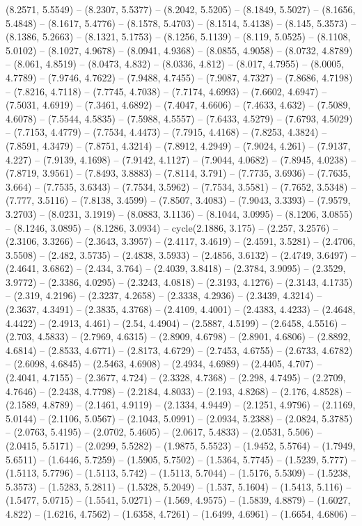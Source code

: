 (8.2571, 5.5549) -- (8.2307, 5.5377) -- (8.2042, 5.5205) -- (8.1849, 5.5027) -- (8.1656, 5.4848) -- (8.1617, 5.4776) -- (8.1578, 5.4703) -- (8.1514, 5.4138) -- (8.145, 5.3573) -- (8.1386, 5.2663) -- (8.1321, 5.1753) -- (8.1256, 5.1139) -- (8.119, 5.0525) -- (8.1108, 5.0102) -- (8.1027, 4.9678) -- (8.0941, 4.9368) -- (8.0855, 4.9058) -- (8.0732, 4.8789) -- (8.061, 4.8519) -- (8.0473, 4.832) -- (8.0336, 4.812) -- (8.017, 4.7955) -- (8.0005, 4.7789) -- (7.9746, 4.7622) -- (7.9488, 4.7455) -- (7.9087, 4.7327) -- (7.8686, 4.7198) -- (7.8216, 4.7118) -- (7.7745, 4.7038) -- (7.7174, 4.6993) -- (7.6602, 4.6947) -- (7.5031, 4.6919) -- (7.3461, 4.6892) -- (7.4047, 4.6606) -- (7.4633, 4.632) -- (7.5089, 4.6078) -- (7.5544, 4.5835) -- (7.5988, 4.5557) -- (7.6433, 4.5279) -- (7.6793, 4.5029) -- (7.7153, 4.4779) -- (7.7534, 4.4473) -- (7.7915, 4.4168) -- (7.8253, 4.3824) -- (7.8591, 4.3479) -- (7.8751, 4.3214) -- (7.8912, 4.2949) -- (7.9024, 4.261) -- (7.9137, 4.227) -- (7.9139, 4.1698) -- (7.9142, 4.1127) -- (7.9044, 4.0682) -- (7.8945, 4.0238) -- (7.8719, 3.9561) -- (7.8493, 3.8883) -- (7.8114, 3.791) -- (7.7735, 3.6936) -- (7.7635, 3.664) -- (7.7535, 3.6343) -- (7.7534, 3.5962) -- (7.7534, 3.5581) -- (7.7652, 3.5348) -- (7.777, 3.5116) -- (7.8138, 3.4599) -- (7.8507, 3.4083) -- (7.9043, 3.3393) -- (7.9579, 3.2703) -- (8.0231, 3.1919) -- (8.0883, 3.1136) -- (8.1044, 3.0995) -- (8.1206, 3.0855) -- (8.1246, 3.0895) -- (8.1286, 3.0934) -- cycle(2.1886, 3.175) -- (2.257, 3.2576) -- (2.3106, 3.3266) -- (2.3643, 3.3957) -- (2.4117, 3.4619) -- (2.4591, 3.5281) -- (2.4706, 3.5508) -- (2.482, 3.5735) -- (2.4838, 3.5933) -- (2.4856, 3.6132) -- (2.4749, 3.6497) -- (2.4641, 3.6862) -- (2.434, 3.764) -- (2.4039, 3.8418) -- (2.3784, 3.9095) -- (2.3529, 3.9772) -- (2.3386, 4.0295) -- (2.3243, 4.0818) -- (2.3193, 4.1276) -- (2.3143, 4.1735) -- (2.319, 4.2196) -- (2.3237, 4.2658) -- (2.3338, 4.2936) -- (2.3439, 4.3214) -- (2.3637, 4.3491) -- (2.3835, 4.3768) -- (2.4109, 4.4001) -- (2.4383, 4.4233) -- (2.4648, 4.4422) -- (2.4913, 4.461) -- (2.54, 4.4904) -- (2.5887, 4.5199) -- (2.6458, 4.5516) -- (2.703, 4.5833) -- (2.7969, 4.6315) -- (2.8909, 4.6798) -- (2.8901, 4.6806) -- (2.8892, 4.6814) -- (2.8533, 4.6771) -- (2.8173, 4.6729) -- (2.7453, 4.6755) -- (2.6733, 4.6782) -- (2.6098, 4.6845) -- (2.5463, 4.6908) -- (2.4934, 4.6989) -- (2.4405, 4.707) -- (2.4041, 4.7155) -- (2.3677, 4.724) -- (2.3328, 4.7368) -- (2.298, 4.7495) -- (2.2709, 4.7646) -- (2.2438, 4.7798) -- (2.2184, 4.8033) -- (2.193, 4.8268) -- (2.176, 4.8528) -- (2.1589, 4.8789) -- (2.1461, 4.9119) -- (2.1334, 4.9449) -- (2.1251, 4.9796) -- (2.1169, 5.0144) -- (2.1106, 5.0567) -- (2.1043, 5.0991) -- (2.0934, 5.2388) -- (2.0824, 5.3785) -- (2.0763, 5.4195) -- (2.0702, 5.4605) -- (2.0617, 5.4833) -- (2.0531, 5.506) -- (2.0415, 5.5171) -- (2.0299, 5.5282) -- (1.9875, 5.5523) -- (1.9452, 5.5764) -- (1.7949, 5.6511) -- (1.6446, 5.7259) -- (1.5905, 5.7502) -- (1.5364, 5.7745) -- (1.5239, 5.777) -- (1.5113, 5.7796) -- (1.5113, 5.742) -- (1.5113, 5.7044) -- (1.5176, 5.5309) -- (1.5238, 5.3573) -- (1.5283, 5.2811) -- (1.5328, 5.2049) -- (1.537, 5.1604) -- (1.5413, 5.116) -- (1.5477, 5.0715) -- (1.5541, 5.0271) -- (1.569, 4.9575) -- (1.5839, 4.8879) -- (1.6027, 4.822) -- (1.6216, 4.7562) -- (1.6358, 4.7261) -- (1.6499, 4.6961) -- (1.6654, 4.6806) -- 